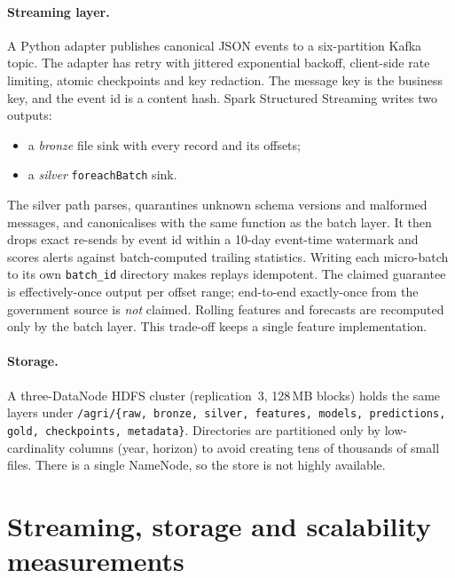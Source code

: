 \documentclass[10pt]{article}
\begin{document}
\paragraph{Streaming layer.}
A Python adapter publishes canonical JSON events to a six-partition Kafka topic.
The adapter has retry with jittered exponential backoff, client-side rate limiting, atomic checkpoints and key redaction.
The message key is the business key, and the event id is a content hash.
Spark Structured Streaming writes two outputs:
\begin{itemize}
  \item a \emph{bronze} file sink with every record and its offsets;
  \item a \emph{silver} \texttt{foreachBatch} sink.
\end{itemize}
The silver path parses, quarantines unknown schema versions and malformed messages, and canonicalises with the same function as the batch layer.
It then drops exact re-sends by event id within a 10-day event-time watermark and scores alerts against batch-computed trailing statistics.
Writing each micro-batch to its own \texttt{batch\_id} directory makes replays idempotent.
The claimed guarantee is effectively-once output per offset range; end-to-end exactly-once from the government source is \emph{not} claimed.
Rolling features and forecasts are recomputed only by the batch layer. This trade-off keeps a single feature implementation.

\paragraph{Storage.}
A three-DataNode HDFS cluster (replication~3, 128\,MB blocks) holds the same layers under \texttt{/agri/\{raw, bronze, silver, features, models, predictions, gold, checkpoints, metadata\}}.
Directories are partitioned only by low-cardinality columns (year, horizon) to avoid creating tens of thousands of small files.
There is a single NameNode, so the store is not highly available.

\section{Streaming, storage and scalability measurements}
\end{document}
